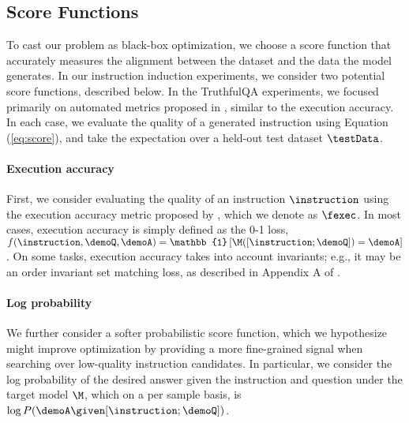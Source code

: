 \subsection{Score Functions} \label{sec:score_function}
To cast our problem as black-box optimization, we choose a score function that accurately measures the alignment between the dataset and the data the model generates. In our instruction induction experiments, we consider two potential score functions, described below. In the TruthfulQA experiments, we focused primarily on automated metrics proposed in \citet{lin2022truthfulqa}, similar to the execution accuracy. In each case, we evaluate the quality of a generated instruction using Equation (\ref{eq:score}), and take the expectation over a held-out test dataset $\testData$.

\paragraph{Execution accuracy} First, we consider evaluating the quality of an instruction $\instruction$ using the execution accuracy metric proposed by \citet{honovich2022instruction}, which we denote as $\fexec$. In most cases, execution accuracy is simply defined as the 0-1 loss, $f(\instruction, \demoQ, \demoA) = \mathbb{1}\left[\M([\instruction ; \demoQ]) = \demoA\right]$. On some tasks, execution accuracy takes into account invariants; e.g., it may be an order invariant set matching loss, as described in Appendix A of \citet{honovich2022instruction}.  

\paragraph{Log probability} We further consider a softer probabilistic score function, which we hypothesize might improve optimization by providing a more fine-grained signal when searching over low-quality instruction candidates. In particular, we consider the log probability of the desired answer given the instruction and question under the target model $\M$, which on a per sample basis, is $\log P(\demoA\given[\instruction ; \demoQ])$.


